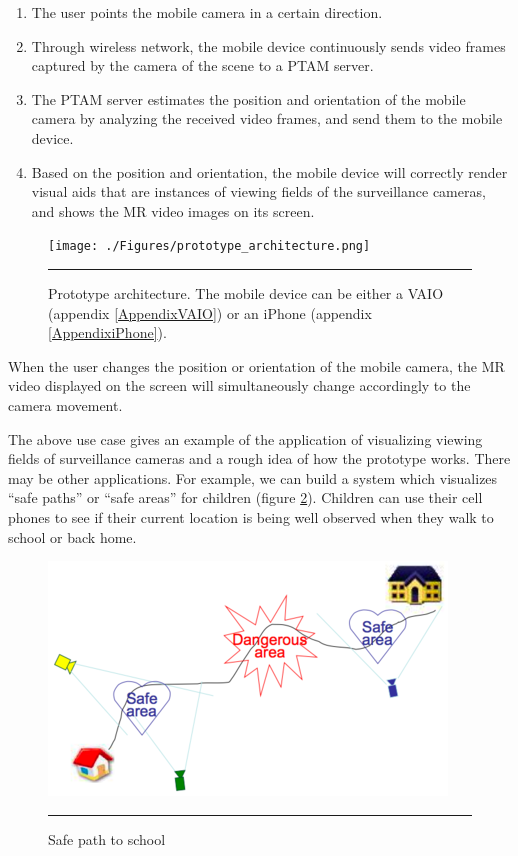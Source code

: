 \begin{enumerate}
	\item The user points the mobile camera in a certain direction.
	\item Through wireless network, the mobile device continuously sends video frames captured by the camera of the scene to a PTAM server.
	\item The PTAM server estimates the position and orientation of the mobile camera by analyzing the received video frames, and send them to the mobile device.
	\item Based on the position and orientation, the mobile device will correctly render visual aids that are instances of viewing fields of the surveillance cameras, and shows the MR video images on its screen.
\end{enumerate}

\begin{figure}[htbp]
	\centering
	\texttt{[image: ./Figures/prototype\_architecture.png]}
	\rule{35em}{0.5pt}
	\caption[Prototype architecture]{Prototype architecture. The mobile device can be either a VAIO (appendix \ref{AppendixVAIO}) or an iPhone (appendix \ref{AppendixiPhone}).}
	\label{fig:PrototypeArchitecture}
\end{figure}

When the user changes the position or orientation of the mobile camera, the MR video displayed on the screen will simultaneously change accordingly to the camera movement.

The above use case gives an example of the application of visualizing viewing fields of surveillance cameras and a rough idea of how the prototype works. There may be other applications. For example, we can build a system which visualizes ``safe paths'' or ``safe areas'' for children (figure \ref{fig:HomeSchool}). Children can use their cell phones to see if their current location is being well observed when they walk to school or back home.

\begin{figure}[htbp]
	\centering
	\includegraphics{./Primitives/home_school.png}
	\rule{35em}{0.5pt}
	\caption[Safe path to school]{Safe path to school}
	\label{fig:HomeSchool}
\end{figure}

